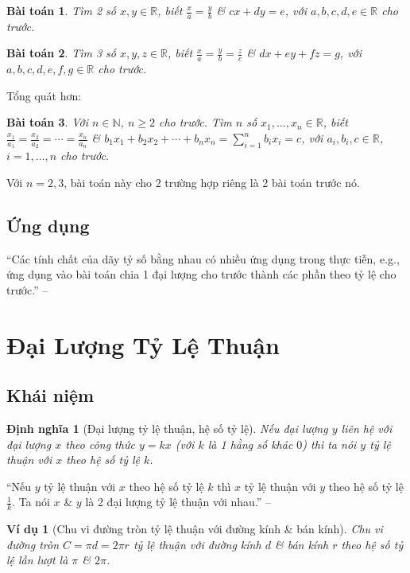 \documentclass[oneside]{book}
\numberwithin{equation}{section}
\newtheorem{dinhnghia}{Định nghĩa}[section]
\newtheorem{vidu}{Ví dụ}[section]
\newtheorem{baitoan}{Bài toán}[section]
\begin{document}
\begin{baitoan}
	Tìm 2 số $x,y\in\mathbb{R}$, biết $\frac{x}{a} = \frac{y}{b}$ \& $cx + dy = e$, với $a,b,c,d,e\in\mathbb{R}$ cho trước.
\end{baitoan}

\begin{baitoan}
	Tìm 3 số $x,y,z\in\mathbb{R}$, biết $\frac{x}{a} = \frac{y}{b} = \frac{z}{c}$ \& $dx + ey + fz = g$, với $a,b,c,d,e,f,g\in\mathbb{R}$ cho trước.
\end{baitoan}
Tổng quát hơn:
\begin{baitoan}
	Với $n\in\mathbb{N}$, $n\ge 2$ cho trước. Tìm $n$ số $x_1,\ldots,x_n\in\mathbb{R}$, biết $\frac{x_1}{a_1} = \frac{x_2}{a_2} = \cdots = \frac{x_n}{a_n}$ \& $b_1x_1 + b_2x_2 + \cdots + b_nx_n = \sum_{i=1}^n b_ix_i = c$, với $a_i,b_i,c\in\mathbb{R}$, $i = 1,\ldots,n$ cho trước.
\end{baitoan}
Với $n = 2,3$, bài toán này cho 2 trường hợp riêng là 2 bài toán trước nó.

\subsection{Ứng dụng}
``Các tính chất của dãy tỷ số bằng nhau có nhiều ứng dụng trong thực tiễn, e.g., ứng dụng vào bài toán chia 1 đại lượng cho trước thành các phần theo tỷ lệ cho trước.'' -- \cite[p. 57]{SGK_Toan_7_Canh_Dieu_tap_1}

\section{Đại Lượng Tỷ Lệ Thuận}

\subsection{Khái niệm}

\begin{dinhnghia}[Đại lượng tỷ lệ thuận, hệ số tỷ lệ]
	Nếu đại lượng $y$ liên hệ với đại lượng $x$ theo công thức $y = kx$ (với $k$ là 1 hằng số khác $0$) thì ta nói \emph{$y$ tỷ lệ thuận} với $x$ theo \emph{hệ số tỷ lệ $k$}.
\end{dinhnghia}
``Nếu $y$ tỷ lệ thuận với $x$ theo hệ số tỷ lệ $k$ thì $x$ tỷ lệ thuận với $y$ theo hệ số tỷ lệ $\frac{1}{k}$. Ta nói $x$ \& $y$ là 2 đại lượng tỷ lệ thuận với nhau.'' -- \cite[p. 59]{SGK_Toan_7_Canh_Dieu_tap_1}

\begin{vidu}[Chu vi đường tròn tỷ lệ thuận với đường kính \& bán kính]
	Chu vi đường tròn $C = \pi d = 2\pi r$ tỷ lệ thuận với đường kính $d$ \& bán kính $r$ theo hệ số tỷ lệ lần lượt là $\pi$ \& $2\pi$. 
\end{vidu}
\end{document}

